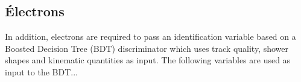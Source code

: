 \subsection{Électrons}\label{chapter-HTT_analysis-section-objects-electrons}

In addition, electrons are required to pass an identification variable based on a Boosted Decision Tree (BDT) discriminator which uses track quality, shower shapes and kinematic quantities as input. The following variables are used as input to the BDT... \cite{cmsElectronMVA}